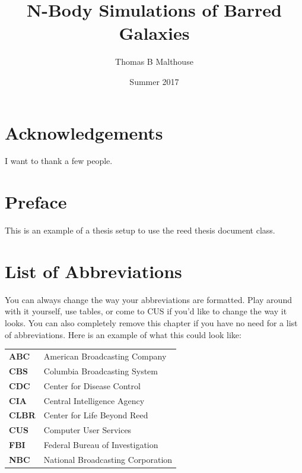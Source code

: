 \documentclass[12pt,twoside]{reedthesis}
\title{N-Body Simulations of Barred Galaxies}
\author{Thomas B Malthouse}
\date{Summer 2017}
\begin{document}
  \maketitle
  \frontmatter %
  \pagestyle{empty} %

    \chapter*{Acknowledgements}
	I want to thank a few people.

    \chapter*{Preface}
	This is an example of a thesis setup to use the reed thesis document class.



    \chapter*{List of Abbreviations}
		You can always change the way your abbreviations are formatted. Play around with it yourself, use tables, or come to CUS if you'd like to change the way it looks. You can also completely remove this chapter if you have no need for a list of abbreviations. Here is an example of what this could look like:

	\begin{table}[h]
	\centering %
	\begin{tabular}{ll}
		\textbf{ABC}  	&  American Broadcasting Company \\
		\textbf{CBS}  	&  Columbia Broadcasting System\\
		\textbf{CDC}  	&  Center for Disease Control \\
		\textbf{CIA}  	&  Central Intelligence Agency\\
		\textbf{CLBR} 	&  Center for Life Beyond Reed\\
		\textbf{CUS}  	&  Computer User Services\\
		\textbf{FBI}  	&  Federal Bureau of Investigation\\
		\textbf{NBC}  	&  National Broadcasting Corporation\\
	\end{tabular}
	\end{table}
\end{document}

